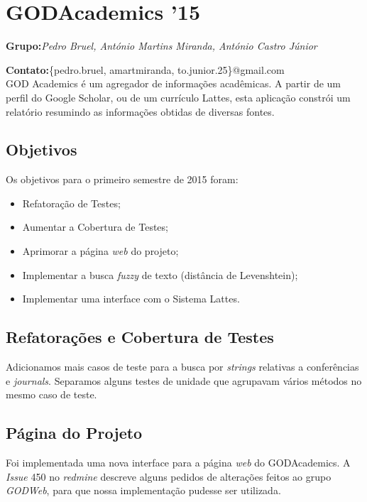 \documentclass[12pt]{article}
\begin{document}
\section{GODAcademics '15}

\textbf{Grupo:}\textit{Pedro Bruel, António Martins Miranda, António Castro Júnior}

\textbf{Contato:}\{pedro.bruel, amartmiranda, to.junior.25\}@gmail.com\\

GOD Academics é um agregador de informações acadêmicas. A partir de um perfil 
do Google Scholar, ou de um currículo Lattes, esta aplicação constrói 
um relatório resumindo as informações obtidas de diversas fontes.

\subsection{Objetivos}

Os objetivos para o primeiro semestre de 2015 foram:

\begin{itemize}
    \item Refatoração de Testes;
    \item Aumentar a Cobertura de Testes;
    \item Aprimorar a página \emph{web} do projeto;
    \item Implementar a busca \emph{fuzzy} de texto (distância de Levenshtein);
    \item Implementar uma interface com o Sistema Lattes.
\end{itemize}

\subsection{Refatorações e Cobertura de Testes}

Adicionamos mais casos de teste para a busca por \emph{strings}
relativas a conferências e \emph{journals}. Separamos alguns testes
de unidade que agrupavam vários métodos no mesmo caso de teste.

\subsection{Página do Projeto}

Foi implementada uma nova interface para a página \emph{web}
do GODAcademics. A \emph{Issue} 450 no \emph{redmine} descreve
alguns pedidos de alterações feitos ao grupo \emph{GODWeb},
para que nossa implementação pudesse ser utilizada.
\end{document}
